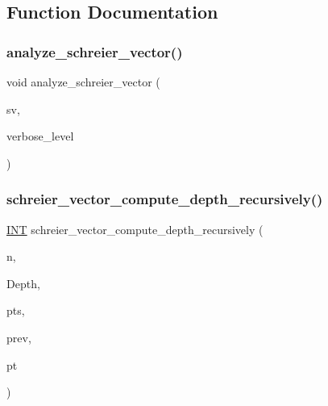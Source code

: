 \subsection{Function Documentation}
\mbox{\label{schreier__vector_8_c_a6997cb994dece4aaa410f5da7867eba9}} 
\subsubsection{\texorpdfstring{analyze\+\_\+schreier\+\_\+vector()}{analyze\_schreier\_vector()}}
{\footnotesize\ttfamily void analyze\+\_\+schreier\+\_\+vector (\begin{DoxyParamCaption}\item[{\mbox{\hyperlink{galois_8h_a09fddde158a3a20bd2dcadb609de11dc}{I\+NT}} $\ast$}]{sv,  }\item[{\mbox{\hyperlink{galois_8h_a09fddde158a3a20bd2dcadb609de11dc}{I\+NT}}}]{verbose\+\_\+level }\end{DoxyParamCaption})}

\mbox{\label{schreier__vector_8_c_a6c8da5811a8de149bfb25f50c2d7e4bc}} 
\subsubsection{\texorpdfstring{schreier\+\_\+vector\+\_\+compute\+\_\+depth\+\_\+recursively()}{schreier\_vector\_compute\_depth\_recursively()}}
{\footnotesize\ttfamily \mbox{\hyperlink{galois_8h_a09fddde158a3a20bd2dcadb609de11dc}{I\+NT}} schreier\+\_\+vector\+\_\+compute\+\_\+depth\+\_\+recursively (\begin{DoxyParamCaption}\item[{\mbox{\hyperlink{galois_8h_a09fddde158a3a20bd2dcadb609de11dc}{I\+NT}}}]{n,  }\item[{\mbox{\hyperlink{galois_8h_a09fddde158a3a20bd2dcadb609de11dc}{I\+NT}} $\ast$}]{Depth,  }\item[{\mbox{\hyperlink{galois_8h_a09fddde158a3a20bd2dcadb609de11dc}{I\+NT}} $\ast$}]{pts,  }\item[{\mbox{\hyperlink{galois_8h_a09fddde158a3a20bd2dcadb609de11dc}{I\+NT}} $\ast$}]{prev,  }\item[{\mbox{\hyperlink{galois_8h_a09fddde158a3a20bd2dcadb609de11dc}{I\+NT}}}]{pt }\end{DoxyParamCaption})}

